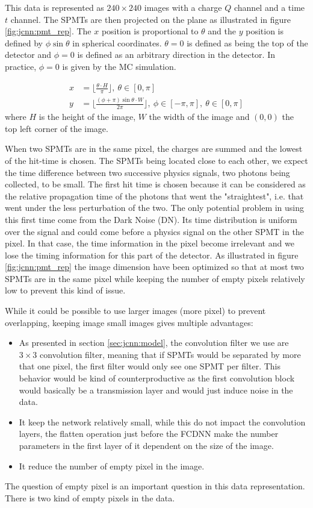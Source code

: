 \documentclass[../main.tex]{subfiles}
\begin{document}
This data is represented as $240 \times 240$ images with a charge $Q$ channel and a time $t$ channel. The SPMTs are then projected on the plane as illustrated in figure \ref{fig:jcnn:pmt_rep}. The $x$ position is proportional to $\theta$ and the $y$ position is defined by $\phi \sin{\theta}$ in spherical coordinates. $\theta = 0$ is defined as being the top of the detector and $\phi = 0$ is defined as an arbitrary direction in the detector. In practice, $\phi = 0$ is given by the MC simulation.

\begin{align}
  x &= \bigg\lfloor \frac{\theta \cdot H}{\pi} \bigg\rfloor, ~ \theta \in [0, \pi] \\
  y &= \bigg\lfloor \frac{(\phi + \pi) \sin{\theta} \cdot W}{2\pi}\bigg\rfloor, ~ \phi \in [-\pi, \pi], ~ \theta \in [0, \pi]
\end{align}
where $H$ is the height of the image, $W$ the width of the image and $(0,0)$ the top left corner of the image.

When two SPMTs are in the same pixel, the charges are summed and the lowest of the hit-time is chosen. The SPMTs being located close to each other, we expect the time difference between two successive physics signals, two photons being collected, to be small. The first hit time is chosen because it can be considered as the relative propagation time of the photons that went the "straightest", i.e. that went under the less perturbation of the two. The only potential problem in using this first time come from the Dark Noise (DN). Its time distribution is uniform over the signal and could come before a physics signal on the other SPMT in the pixel. In that case, the time information in the pixel become irrelevant and we lose the timing information for this part of the detector.
As illustrated in figure \ref{fig:jcnn:pmt_rep} the image dimension have been optimized so that at most two SPMTs are in the same pixel while keeping the number of empty pixels relatively low to prevent this kind of issue.

While it could be possible to use larger images (more pixel) to prevent overlapping, keeping image small images gives multiple advantages:
\begin{itemize}
  \item As presented in section \ref{sec:jcnn:model}, the convolution filter we use are $3 \times 3$ convolution filter, meaning that if SPMTs would be separated by more that one pixel, the first filter would only see one SPMT per filter. This behavior would be kind of counterproductive as the first convolution block would basically be a transmission layer and would just induce noise in the data.
  \item It keep the network relatively small, while this do not impact the convolution layers, the flatten operation just before the FCDNN make the number parameters in the first layer of it dependent on the size of the image.
  \item It reduce the number of empty pixel in the image.
\end{itemize}
The question of empty pixel is an important question in this data representation. There is two kind of empty pixels in the data.
\end{document}
